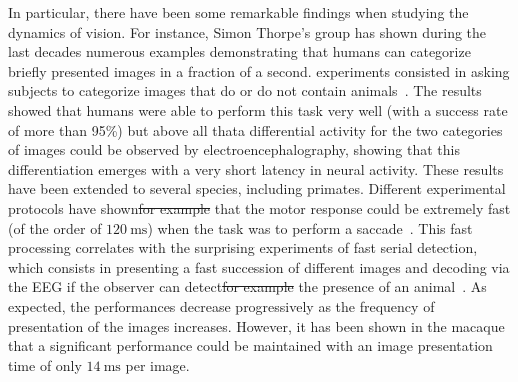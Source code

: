 \documentclass[brainsci, %
               review,accept,pdftex,moreauthors %
               ]{Definitions/mdpi}
\newcommand{\ms}{\si{\milli\second}}%
\providecommand{\DIFadd}[1]{{\protect\color{blue}\uwave{#1}}} %
\providecommand{\DIFdel}[1]{{\protect\color{red}\sout{#1}}}                      %
\providecommand{\DIFaddbegin}{} %
\providecommand{\DIFaddend}{} %
\providecommand{\DIFdelbegin}{} %
\providecommand{\DIFdelend}{} %
\newcommand{\DIFscaledelfig}{0.5}
\newlength{\DIFdelgraphicswidth} %
\newlength{\DIFdelgraphicsheight} %
\newcommand{\DIFaddincludegraphics}[2][]{{\color{blue}\fbox{\DIFOincludegraphics[#1]{#2}}}} %
\newcommand{\DIFdelincludegraphics}[2][]{%
\sbox{\DIFdelgraphicsbox}{\DIFOincludegraphics[#1]{#2}}%
\settoboxwidth{\DIFdelgraphicswidth}{\DIFdelgraphicsbox} %
\settoboxtotalheight{\DIFdelgraphicsheight}{\DIFdelgraphicsbox} %
\scalebox{\DIFscaledelfig}{%
\parbox[b]{\DIFdelgraphicswidth}{\usebox{\DIFdelgraphicsbox}\\[-\baselineskip] \rule{\DIFdelgraphicswidth}{0em}}\llap{\resizebox{\DIFdelgraphicswidth}{\DIFdelgraphicsheight}{%
\setlength{\unitlength}{\DIFdelgraphicswidth}%
\begin{picture}(1,1)%
\thicklines\linethickness{2pt} %
{\color[rgb]{1,0,0}\put(0,0){\framebox(1,1){}}}%
{\color[rgb]{1,0,0}\put(0,0){\line( 1,1){1}}}%
{\color[rgb]{1,0,0}\put(0,1){\line(1,-1){1}}}%
\end{picture}%
}\hspace*{3pt}}} %
} %
\DeclareRobustCommand{\DIFaddbegin}{\DIFOaddbegin \let\includegraphics\DIFaddincludegraphics} %
\DeclareRobustCommand{\DIFaddend}{\DIFOaddend \let\includegraphics\DIFOincludegraphics} %
\DeclareRobustCommand{\DIFdelbegin}{\DIFOdelbegin \let\includegraphics\DIFdelincludegraphics} %
\DeclareRobustCommand{\DIFdelend}{\DIFOaddend \let\includegraphics\DIFOincludegraphics} %
\begin{document}
\DIFaddend In particular, there have been some remarkable findings when studying the dynamics of vision. For instance, Simon Thorpe's group has shown during the last decades numerous examples demonstrating that humans can categorize briefly presented images in a fraction of a second.  experiments consisted in asking subjects to categorize images that do or do not contain animals~\citep{thorpe_speed_1996}. The results showed that humans were able to perform this task very well (with a success rate of more than 95\%) but above all that\DIFaddbegin \DIFadd{, }\DIFaddend a differential activity for the two categories of images could be observed by electroencephalography, showing that this differentiation emerges with a very short latency in neural activity. These results have been extended to several species, including primates. Different experimental protocols have shown\DIFdelbegin \DIFdel{for example }\DIFdelend \DIFaddbegin \DIFadd{, for example, }\DIFaddend that the motor response could be extremely fast (of the order of $120~\ms$) when the task was to perform a saccade~\citep{kirchner_ultra-rapid_2006}. This fast processing correlates with the surprising experiments of fast serial detection, which consists in presenting a fast succession of different images and decoding via the EEG if the observer can detect\DIFdelbegin \DIFdel{for example }\DIFdelend \DIFaddbegin \DIFadd{, for example, }\DIFaddend the presence of an animal~\citep{keysers_speed_2001}. As expected, the performances decrease progressively as the frequency of presentation of the images increases. However, it has been shown in the macaque that a significant performance could be maintained with an image presentation time of only $14~\ms$ per image.
\end{document}
